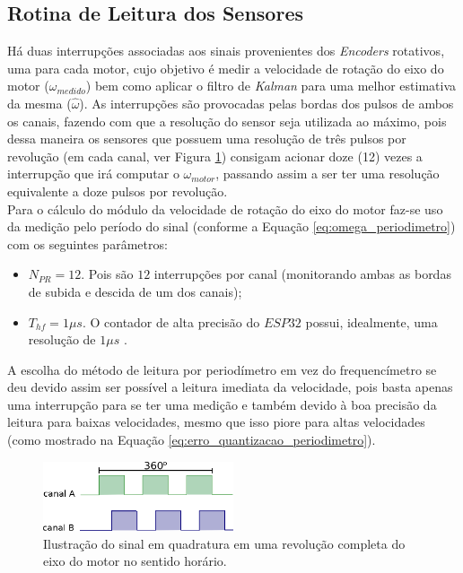 \subsection{Rotina de Leitura dos Sensores}
\label{subsec:rotina_sensores}

Há duas interrupções associadas aos sinais provenientes dos \emph{Encoders} rotativos, uma para cada motor, cujo objetivo é medir a velocidade de rotação do eixo do motor ($\omega_{medido}$) bem como aplicar o filtro de \emph{Kalman} para uma melhor estimativa da mesma ($\hat{\omega}$). As interrupções são provocadas pelas bordas dos pulsos de ambos os canais, fazendo com que a resolução do sensor seja utilizada ao máximo, pois dessa maneira os sensores que possuem uma resolução de três pulsos por revolução (em cada canal, ver Figura \ref{fig:ilustracao_uma_revolucao}) consigam acionar doze (12) vezes a interrupção que irá computar o $\omega_{motor}$, passando assim a ser ter uma resolução equivalente a doze pulsos por revolução.\\

Para o cálculo do módulo da velocidade de rotação do eixo do motor faz-se uso da medição pelo período do sinal (conforme a Equação \ref{eq:omega_periodimetro}) com os seguintes parâmetros:

\begin{itemize}
    \item $N_{PR} = 12$. Pois são $12$ interrupções por canal (monitorando ambas as bordas de subida e descida de um dos canais);
    \item $T_{hf} = 1\mu{}s$. O contador de alta precisão do $ESP32$ possui, idealmente, uma resolução de $1\mu{}s$ \cite{esp}.
\end{itemize}

A escolha do método de leitura por periodímetro em vez do frequencímetro se deu devido assim ser possível a leitura imediata da velocidade, pois basta apenas uma interrupção para se ter uma medição e também devido à boa precisão da leitura para baixas velocidades, mesmo que isso piore para altas velocidades (como mostrado na Equação \ref{eq:erro_quantizacao_periodimetro}).

\begin{figure}[H]
    \centering
    \includegraphics[width=0.5\textwidth]{figuras/ilustracoes/sinal_enquadratura_uma_revolucao.eps}
    \caption{Ilustração do sinal em quadratura em uma revolução completa do eixo do motor no sentido horário.}
    \label{fig:ilustracao_uma_revolucao}
\end{figure}

